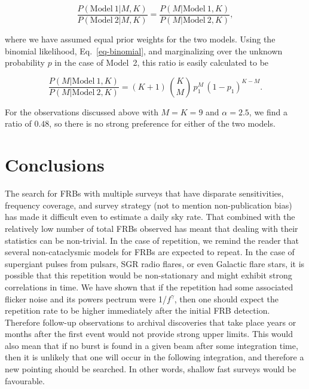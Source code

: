 \documentclass[useAMS,usenatbib]{mn2e}
\begin{document}
   
\begin{equation}
	\frac{P(\mathrm{Model}~1|M,K)}{P(\mathrm{Model}~2|M,K)} = \frac{P(M|\mathrm{Model}~1,K)}{P(M|\mathrm{Model}~2,K)},
\end{equation}

\noindent where we have assumed equal prior weights for the two models. 
Using the binomial likelihood, Eq.~\eqref{eq-binomial}, and
marginalizing over the unknown probability $p$ in the case of Model~2, 
this ratio is easily calculated to be

\begin{equation}
\frac{P(M|\mathrm{Model}~1,K)}{P(M|\mathrm{Model}~2,K)} = (K + 1) \, \binom{K}{M} \, p_1^M \, \left(1 - p_1\right)^{K-M}.
\end{equation}

\noindent For the observations discussed above with $M = K = 9$ 
and $\alpha = 2.5$, we find a ratio of $0.48$, so there is
no strong preference for either of the two models.

\section{Conclusions}

The search for FRBs with multiple surveys that have disparate sensitivities, 
frequency coverage, and survey strategy (not to mention non-publication bias) 
has made it difficult even to 
estimate a daily sky rate. 
That combined with the relatively low number of total FRBs observed 
has meant that dealing with their statistics can be non-trivial. In 
the case of repetition, we remind the reader that several non-cataclysmic 
models for FRBs are expected to repeat. In the case of supergiant 
pulses from pulsars, SGR radio flares, or even Galactic flare stars, it is possible 
that this repetition would be non-stationary and might exhibit strong correlations 
in time. We have shown that if the repetition had some associated flicker noise 
and its powers pectrum were 1/$f^\gamma$, then one should expect the repetition 
rate to be higher immediately after the initial FRB detection. Therefore follow-up 
observations to archival discoveries that take place years or 
months after the first event would not provide strong upper limits. 
This would also mean that if no burst is found in a given beam after some 
integration time, then it is unlikely that one will occur in the following integration, and therefore 
a new pointing should be searched. In other words, shallow fast surveys would be favourable. 
\end{document}
